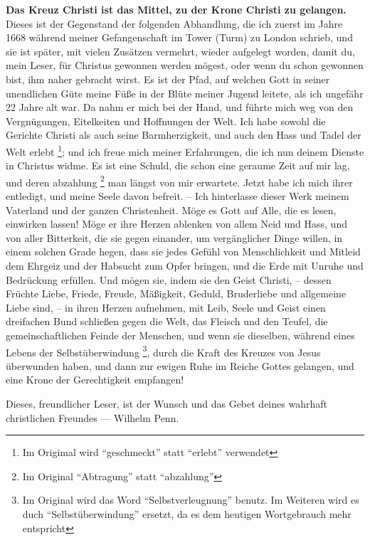 \textbf{Das Kreuz Christi ist das Mittel, zu der Krone Christi zu gelangen.} Dieses ist der Gegenstand der folgenden Abhandlung, die ich zuerst im Jahre 1668 während meiner Gefangenschaft im Tower (Turm) zu London schrieb, und sie ist später, mit vielen Zusätzen vermehrt, wieder aufgelegt worden, damit du, mein Leser, für Christus gewonnen werden mögest, oder wenn du schon gewonnen bist, ihm naher gebracht wirst. Es ist der Pfad, auf welchen Gott in seiner unendlichen Güte meine Füße in der Blüte meiner Jugend leitete, als ich ungefähr 22 Jahre alt war. Da nahm er mich bei der Hand, und führte mich weg von den Vergnügungen, Eitelkeiten und Hoffnungen der Welt. Ich habe sowohl die Gerichte Christi als auch seine Barmherzigkeit, und auch den Hass und Tadel der Welt erlebt \footnote{Im Origimal wird "`geschmeckt"' statt "`erlebt"' verwendet}; und ich freue mich meiner Erfahrungen, die ich nun deinem Dienste in Christus widme. Es ist eine Schuld, die schon eine geraume Zeit auf mir lag, und deren abzahlung \footnote{Im Original "`Abtragung"' statt "`abzahlung"'} man längst von mir erwartete. Jetzt habe ich mich ihrer entledigt, und meine Seele davon befreit. -- Ich hinterlasse dieser Werk meinem Vaterland und der ganzen Christenheit. Möge es Gott auf Alle, die es lesen, einwirken lassen! Möge er ihre Herzen ablenken von allem Neid und Hass, und von aller Bitterkeit, die sie gegen einander, um vergänglicher Dinge willen, in einem solchen Grade hegen, dass sie jedes Gefühl von Menschlichkeit und Mitleid dem Ehrgeiz und der Habsucht zum Opfer bringen, und die Erde mit Unruhe und Bedrückung erfüllen. Und mögen sie, indem sie den Geist Christi, -- dessen Früchte Liebe, Friede, Freude, Mäßigkeit, Geduld, Bruderliebe und allgemeine Liebe sind, -- in ihren Herzen aufnehmen, mit Leib, Seele und Geist einen dreifachen Bund schließen gegen die Welt, das Fleisch und den Teufel, die gemeinschaftlichen Feinde der Menschen, und wenn sie dieselben, während eines Lebens der Selbstüberwindung \footnote{Im Original wird das Word "`Selbstverleugnung"' benutz. Im Weiteren wird es duch "`Selbstüberwindung"' ersetzt, da es dem heutigen Wortgebrauch mehr entspricht}, durch die Kraft des Kreuzes von Jesus überwunden haben, und dann zur ewigen Ruhe im Reiche Gottes gelangen, und eine Krone der Gerechtigkeit empfangen!

Dieses, freundlicher Leser, ist der Wunsch und das Gebet deines wahrhaft christlichen Freundes --- Wilhelm Penn.